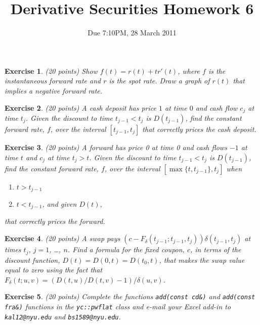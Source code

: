\documentclass[11pt,fleqn]{amsproc}
\newtheorem{xca}{Exercise}
\begin{document}
\title{Derivative Securities Homework 6}
\author{Due 7:10PM, 28 March 2011}

\maketitle


\begin{xca}{(20 points)}
Show $f(t) = r(t) + t r'(t)$, where $f$ is the instantaneous forward rate and
$r$ is the spot rate. Draw a graph of $r(t)$ that implies a
negative forward rate.
\end{xca}

\begin{xca}{(20 points)}
A cash deposit has price $1$ at time $0$ and cash flow $c_j$
at time $t_j$.
Given the discount to time $t_{j-1} < t_j$ is $D(t_{j-1})$, find the
constant forward rate, $f$,
over the interval $[t_{j-1}, t_j]$ that correctly prices the cash deposit.
\end{xca}

\begin{xca}{(20 points)}
A forward has price 0 at time 0 and cash flows $-1$ at time $t$ and
$c_j$ at time $t_j > t$. Given the discount to time $t_{j-1} < t_j$ is
$D(t_{j-1})$, find the constant forward rate, $f$, over the interval
$[\max\{t, t_{j-1}\}, t_j]$ when

\begin{enumerate}
\item $t > t_{j-1}$
\item $t < t_{j-1}$, and given $D(t)$,
\end{enumerate}
that correctly prices the forward.

\end{xca}

\begin{xca}{(20 points)}
A swap pays $(c - F_\delta(t_{j-1}; t_{j-1}, t_j))\delta(t_{j-1}, t_j)$
at times $t_j$, $j = 1$, \dots, $n$.  Find a formula for the fixed coupon,
$c$, in terms of the discount function, $D(t) = D(0,t) = D(t_0, t)$,
that makes the swap value equal to zero using the fact that
$F_\delta(t; u, v) = (D(t, u)/D(t, v) - 1)/\delta(u, v)$.

\end{xca}

\begin{xca}{(20 points)}
Complete the functions {\tt add(const cd\&)} and {\tt add(const fra\&)}
functions in the {\tt yc::pwflat} class and e-mail your Excel add-in to
{\tt kal12@nyu.edu} and {\tt bs1589@nyu.edu}.

\end{xca}
\end{document}
